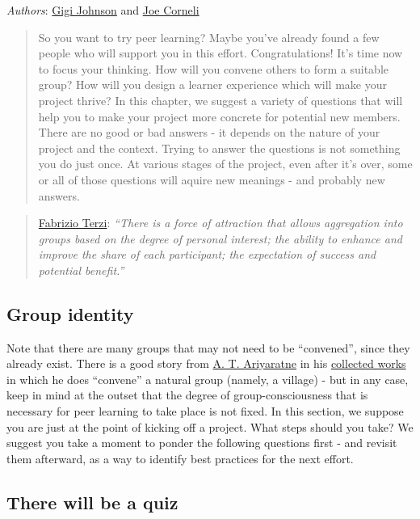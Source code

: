 \emph{Authors}:
\href{http://peeragogy.org/resources/meet-the-team/}{Gigi Johnson} and
\href{http://peeragogy.org/resources/meet-the-team/}{Joe Corneli}

\begin{quote}
So you want to try peer learning? Maybe you've already found a few
people who will support you in this effort. Congratulations! It's time
now to focus your thinking. How will you convene others to form a
suitable group? How will you design a learner experience which will make
your project thrive? In this chapter, we suggest a variety of questions
that will help you to make your project more concrete for potential new
members. There are no good or bad answers - it depends on the nature of
your project and the context. Trying to answer the questions is not
something you do just once. At various stages of the project, even after
it's over, some or all of those questions will aquire new meanings - and
probably new answers.
\end{quote}
\begin{quote}
\href{http://peeragogy.org/resources/meet-the-team/}{Fabrizio Terzi}:
\emph{``There is a force of attraction that allows aggregation into
groups based on the degree of personal interest; the ability to enhance
and improve the share of each participant; the expectation of success
and potential benefit.''}
\end{quote}
\subsection{Group identity}

Note that there are many groups that may not need to be ``convened'',
since they already exist. There is a good story from
\href{http://www.sarvodayausa.org/learn/a-t-ariyartne/}{A. T.
Ariyaratne} in his
\href{http://www.sarvodaya.org/about/philosophy/collected-works-vol-1/rural-self-help}{collected
works} in which he does ``convene'' a natural group (namely, a village)
- but in any case, keep in mind at the outset that the degree of
group-consciousness that is necessary for peer learning to take place is
not fixed. In this section, we suppose you are just at the point of
kicking off a project. What steps should you take? We suggest you take a
moment to ponder the following questions first - and revisit them
afterward, as a way to identify best practices for the next effort.

\subsection{There will be a quiz}

